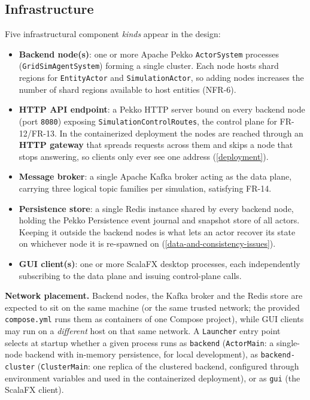 \documentclass{scrreprt}
\begin{document}
\subsection{Infrastructure}\label{infrastructure}

Five infrastructural component \emph{kinds} appear in the design:

\begin{itemize}
  \item \textbf{Backend node(s)}: one or more Apache Pekko \texttt{ActorSystem} processes
  (\texttt{GridSimAgentSystem}) forming a single cluster. Each node hosts shard regions for
  \texttt{EntityActor} and \texttt{SimulationActor}, so adding nodes increases the number of
  shard regions available to host entities (\textsc{NFR-6}).
  \item \textbf{HTTP API endpoint}: a Pekko HTTP server bound on every backend node
  (port \texttt{8080}) exposing \texttt{SimulationControlRoutes}, the control plane for
  \textsc{FR-12}/\textsc{FR-13}. In the containerized deployment the nodes are reached through
  an \textbf{HTTP gateway} that spreads requests across them and skips
  a node that stops answering, so clients only ever see one address (\cref{deployment}).
  \item \textbf{Message broker}: a single Apache Kafka broker acting as the data plane,
  carrying three logical topic families per simulation, satisfying \textsc{FR-14}.
  \item \textbf{Persistence store}: a single Redis instance shared by every backend node,
  holding the Pekko Persistence event journal and snapshot store of all actors. Keeping it
  outside the backend nodes is what lets an actor recover its state on whichever node it is
  re-spawned on (\cref{data-and-consistency-issues}).
  \item \textbf{GUI client(s)}: one or more ScalaFX desktop processes, each independently subscribing to the data plane and issuing control-plane
  calls.
\end{itemize}

\textbf{Network placement.} Backend nodes, the Kafka broker and the Redis store are expected
to sit on the same machine (or the same trusted network; the provided \texttt{compose.yml} runs
them as containers of one Compose project), while GUI clients may run on a \emph{different} host on
that same network. A \texttt{Launcher} entry point selects at startup whether a given process
runs as \texttt{backend} (\texttt{ActorMain}: a single-node backend with in-memory
persistence, for local development), as \texttt{backend-cluster} (\texttt{ClusterMain}: one
replica of the clustered backend, configured through environment variables and used in the
containerized deployment), or as \texttt{gui} (the ScalaFX client).
\end{document}
